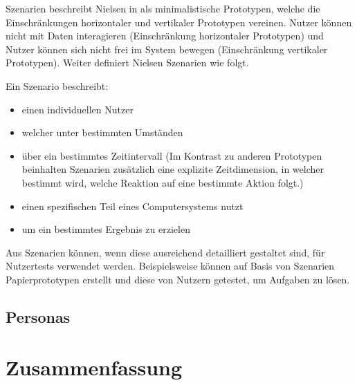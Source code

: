 Szenarien beschreibt Nielsen in \cite[S.~99]{Nielsen1994} als minimalistische Prototypen, welche die Einschränkungen horizontaler und vertikaler Prototypen vereinen. 
Nutzer können nicht mit Daten interagieren (Einschränkung horizontaler Prototypen) und Nutzer können sich nicht frei im System bewegen (Einschränkung vertikaler Prototypen).
 \cite[S.~100]{Nielsen1994} Weiter definiert Nielsen Szenarien wie folgt. 
 
 Ein Szenario beschreibt:

\begin{itemize}
	\item einen individuellen Nutzer
	\item welcher unter bestimmten Umständen
	\item über ein bestimmtes Zeitintervall (Im Kontrast zu anderen Prototypen beinhalten Szenarien zusätzlich eine explizite Zeitdimension, in welcher bestimmt wird, welche Reaktion auf eine bestimmte Aktion folgt.)
	\item einen spezifischen Teil eines Computersystems nutzt
	\item um ein bestimmtes Ergebnis zu erzielen
\end{itemize}

 \cite[S.~101]{Nielsen1994} Aus Szenarien können, wenn diese ausreichend detailliert gestaltet sind, für Nutzertests verwendet werden. Beispielsweise können auf Basis von Szenarien Papierprototypen erstellt und diese von Nutzern getestet, um Aufgaben zu lösen. 

\subsection{Personas}

\section{Zusammenfassung}




